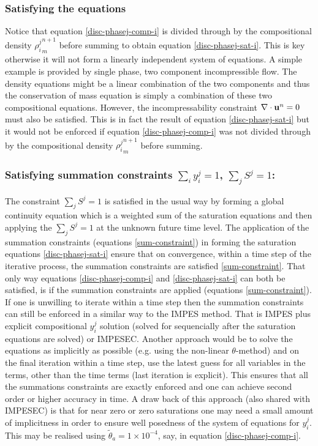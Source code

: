 \subsubsection{Satisfying the equations } 
Notice that equation \ref{disc-phasej-comp-i} is divided through by the 
compositional density ${\rho_i^j}_m^{n+1}$ before summing to obtain equation 
\ref{disc-phasej-sat-i}. This is key otherwise it will not form a 
linearly independent system of equations. A simple example is 
provided by single phase, two component incompressible flow. 
The density equations might be a linear combination of the 
two components and thus the conservation of 
mass equation is simply a combination of these two compositional 
equations. However, the incompressability constraint $\nabla \cdot {\bf u}^n=0$ 
must also be satisfied. This is in fact the result of 
equation \ref{disc-phasej-sat-i} but it would not be enforced 
if equation \ref{disc-phasej-comp-i} was not divided through by the 
compositional density ${\rho_i^j}_m^{n+1}$ before summing. 




\subsubsection{Satisfying summation constraints $\sum_i y_i^j=1$, $\sum_j S^j=1$:} 
The constraint $\sum_j S^j=1$ is satisfied in the usual way by 
forming a global continuity equation which is a weighted 
sum of the saturation equations and then applying the $\sum_j S^j=1$ at 
the unknown future time level. The application of 
the summation constraints (equations \ref{sum-constraint}) 
in forming the saturation equations \ref{disc-phasej-sat-i} ensure 
that on convergence, within a time step of the iterative process,  
the summation constraints are satisfied \ref{sum-constraint}. 
That only way equations \ref{disc-phasej-comp-i} 
and \ref{disc-phasej-sat-i} can both be satisfied, is if the 
summation constraints are applied (equations \ref{sum-constraint}). 
If one is unwilling to iterate within a time step then the 
summation constraints can still be enforced in a similar 
way to the IMPES method. 
That is IMPES plus explicit compositional $y_i^j$ solution 
(solved for sequencially after the saturation equations are solved) or IMPESEC. 
Another approach would be to solve the equations as implicitly 
as possible (e.g. using the non-linear $\theta$-method) and on the 
final iteration within a time step, use the latest guess for 
all variables in the terms, other than the time 
terms (last iteration is explicit). This ensures that 
all the summations constraints are exactly enforced and 
one can achieve second order or higher accuracy in time. 
A draw back of this approach (also shared with IMPESEC) is 
that for near zero or zero 
saturations one may need a small amount of 
implicitness in order to ensure well posedness of the 
system of equations for $y_i^j$. This may be realised using  
$\tilde\theta_a=1\times 10^{-4}$, say, 
in equation \ref{disc-phasej-comp-i}. 


